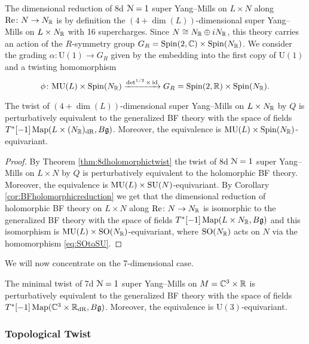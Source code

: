 \documentclass[10pt, oneside]{article}
\newcommand{\MU}{\mathrm{MU}}
\renewcommand{\Re}{\mathrm{Re}}
\renewcommand{\U}{\mathrm{U}}
\begin{document}
The dimensional reduction of 8d $\mathcal N=1$ super Yang--Mills on $L\times N$ along $\Re\colon N\rightarrow N_\RR$ is by definition the $(4+\dim(L))$-dimensional super Yang--Mills on $L\times N_\mathbb R$ with 16 supercharges. Since $N\cong N_\mathbb R\oplus iN_\mathbb R$, this theory carries an action of the $R$-symmetry group $G_R=\mathrm{Spin}(2, \mathbb C)\times \mathrm{Spin}(N_\mathbb R)$. We consider the grading $\alpha\colon \U(1)\rightarrow G_R$ given by the embedding into the first copy of $\U(1)$ and a twisting homomorphism
\[\phi\colon \MU(L)\times \Spin(N_\RR)\xrightarrow{\det^{1/2}\times \id} G_R=\Spin(2, \RR)\times \Spin(N_\RR).\]

\begin{theorem}
The twist of $(4+\dim(L))$-dimensional super Yang--Mills on $L\times N_\mathbb R$ by $Q$ is perturbatively equivalent to the generalized BF theory with the space of fields $T^*[-1] \operatorname{Map}(L\times (N_\mathbb R)_{\mathrm{dR}}, B\mathfrak g)$. Moreover, the equivalence is $\MU(L)\times \Spin(N_\RR)$-equivariant.
\label{thm:8dBFreduction}
\end{theorem}
\begin{proof}
By Theorem \ref{thm:8dholomorphictwist} the twist of 8d $\mathcal N=1$ super Yang--Mills on $L\times N$ by $Q$ is perturbatively equivalent to the holomorphic BF theory. Moreover, the equivalence is $\MU(L)\times \SU(N)$-equivariant. By Corollary \ref{cor:BFholomorphicreduction} we get that the dimensional reduction of holomorphic BF theory on $L\times N$ along $\Re\colon N\rightarrow N_\RR$ is isomorphic to the generalized BF theory with the space of fields $T^*[-1]\operatorname{Map}(L\times N_\mathbb R, B\mathfrak g)$ and this isomorphism is $\MU(L)\times \SO(N_\RR)$-equivariant, where $\mathrm{SO}(N_\mathbb R)$ acts on $N$ via the homomorphism \eqref{eq:SOtoSU}.
\end{proof}

We will now concentrate on the 7-dimensional case.

\begin{theorem}
The minimal twist of 7d $\mathcal N=1$ super Yang--Mills on $M=\mathbb C^3\times \mathbb R$ is perturbatively equivalent to the generalized BF theory with the space of fields $T^*[-1]\operatorname{Map}(\mathbb C^3\times \mathbb R_{\mathrm{dR}}, B\mathfrak g)$. Moreover, the equivalence is $\U(3)$-equivariant.
\label{thm:7dminimaltwist}
\end{theorem}

\subsubsection{Topological Twist}
\label{sect:7dtopologicaltwist}
\end{document}
